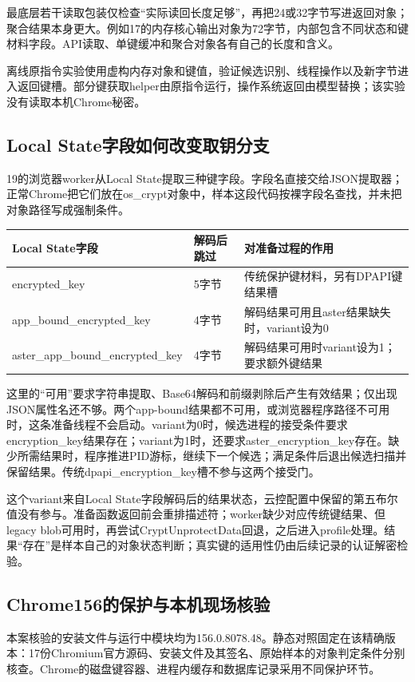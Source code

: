 \documentclass[UTF8,a4paper,zihao=5,fontset=windows]{ctexart}
\newcommand{\code}[1]{{\ttfamily\small #1}}
\begin{document}
最底层若干读取包装仅检查“实际读回长度足够”，再把24或32字节写进返回对象；聚合结果本身更大。例如17的内存核心输出对象为72字节，内部包含不同状态和键材料字段。API读取、单键缓冲和聚合对象各有自己的长度和含义。

离线原指令实验使用虚构内存对象和键值，验证候选识别、线程操作以及新字节进入返回键槽。部分键获取helper由原指令运行，操作系统返回由模型替换；该实验没有读取本机Chrome秘密。

\subsection{Local State字段如何改变取钥分支}
19的浏览器worker从\code{Local State}提取三种键字段。字段名直接交给JSON提取器；正常Chrome把它们放在\code{os\_crypt}对象中，样本这段代码按裸字段名查找，并未把对象路径写成强制条件。
\begin{longtable}{@{}L{62mm}L{20mm}L{68mm}@{}}\toprule Local State字段 & 解码后跳过 & 对准备过程的作用\\\midrule\endhead
\code{encrypted\_\allowbreak{}key} & 5字节 & 传统保护键材料，另有DPAPI键结果槽\\
\code{app\_\allowbreak{}bound\_\allowbreak{}encrypted\_\allowbreak{}key} & 4字节 & 解码结果可用且aster结果缺失时，variant设为0\\
\code{aster\_\allowbreak{}app\_\allowbreak{}bound\_\allowbreak{}encrypted\_\allowbreak{}key} & 4字节 & 解码结果可用时variant设为1；要求额外键结果\\\bottomrule\end{longtable}

这里的“可用”要求字符串提取、Base64解码和前缀剥除后产生有效结果；仅出现JSON属性名还不够。两个app-bound结果都不可用，或浏览器程序路径不可用时，这条准备线程不会启动。variant为0时，候选进程的接受条件要求\code{encryption\_key}结果存在；variant为1时，还要求\code{aster\_encryption\_key}存在。缺少所需结果时，程序推进PID游标，继续下一个候选；满足条件后退出候选扫描并保留结果。传统\code{dpapi\_encryption\_key}槽不参与这两个接受门。

这个variant来自Local State字段解码后的结果状态，云控配置中保留的第五布尔值没有参与。准备函数返回前会重排描述符；worker缺少对应传统键结果、但legacy blob可用时，再尝试\code{CryptUnprotectData}回退，之后进入profile处理。结果“存在”是样本自己的对象状态判断；真实键的适用性仍由后续记录的认证解密检验。

\subsection{Chrome156的保护与本机现场核验}
本案核验的安装文件与运行中模块均为\code{156.0.8078.48}。静态对照固定在该精确版本：17份Chromium官方源码、安装文件及其签名、原始样本的对象判定条件分别核查。Chrome的磁盘键容器、进程内缓存和数据库记录采用不同保护环节。\cite{encryptor156,appbound156,caller156}
\end{document}
